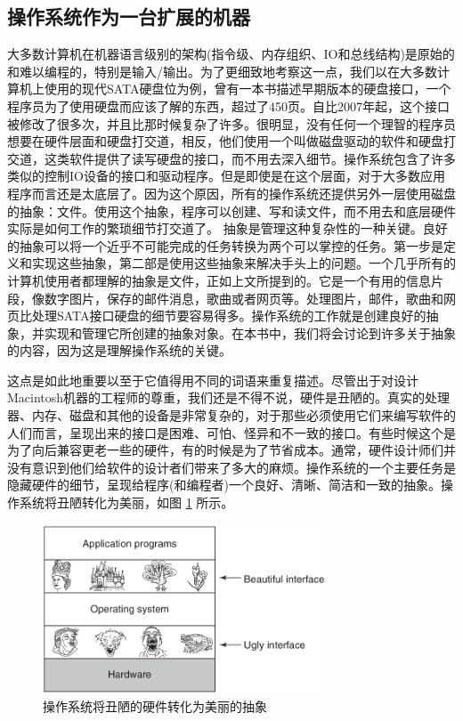 \subsection{操作系统作为一台扩展的机器}

	大多数计算机在机器语言级别的架构(指令级、内存组织、IO和总线结构)是原始的和难以编程的，特别是输入/输出。为了更细致地考察这一点，我们以在大多数计算机上使用的现代SATA硬盘位为例，曾有一本书描述早期版本的硬盘接口，一个程序员为了使用硬盘而应该了解的东西，超过了450页。自比2007年起，这个接口被修改了很多次，并且比那时候复杂了许多。很明显，没有任何一个理智的程序员想要在硬件层面和硬盘打交道，相反，他们使用一个叫做磁盘驱动的软件和硬盘打交道，这类软件提供了读写硬盘的接口，而不用去深入细节。操作系统包含了许多类似的控制IO设备的接口和驱动程序。但是即使是在这个层面，对于大多数应用程序而言还是太底层了。因为这个原因，所有的操作系统还提供另外一层使用磁盘的抽象：文件。使用这个抽象，程序可以创建、写和读文件，而不用去和底层硬件实际是如何工作的繁琐细节打交道了。
	抽象是管理这种复杂性的一种关键。良好的抽象可以将一个近乎不可能完成的任务转换为两个可以掌控的任务。第一步是定义和实现这些抽象，第二部是使用这些抽象来解决手头上的问题。一个几乎所有的计算机使用者都理解的抽象是文件，正如上文所提到的。它是一个有用的信息片段，像数字图片，保存的邮件消息，歌曲或者网页等。处理图片，邮件，歌曲和网页比处理SATA接口硬盘的细节要容易得多。操作系统的工作就是创建良好的抽象，并实现和管理它所创建的抽象对象。在本书中，我们将会讨论到许多关于抽象的内容，因为这是理解操作系统的关键。
	
	这点是如此地重要以至于它值得用不同的词语来重复描述。尽管出于对设计Macintosh机器的工程师的尊重，我们还是不得不说，硬件是丑陋的。真实的处理器、内存、磁盘和其他的设备是非常复杂的，对于那些必须使用它们来编写软件的人们而言，呈现出来的接口是困难、可怕、怪异和不一致的接口。有些时候这个是为了向后兼容更老一些的硬件，有的时候是为了节省成本。通常，硬件设计师们并没有意识到他们给软件的设计者们带来了多大的麻烦。操作系统的一个主要任务是隐藏硬件的细节，呈现给程序(和编程者)一个良好、清晰、简洁和一致的抽象。操作系统将丑陋转化为美丽，如图 \ref{fig:uglybeautiful} 所示。
	

	\begin{figure}[ht]\small
		\centering
		\includegraphics[width=0.75\textwidth]{FIG/1-2.png}
		\caption{操作系统将丑陋的硬件转化为美丽的抽象}\label{fig:uglybeautiful}
	\end{figure}


